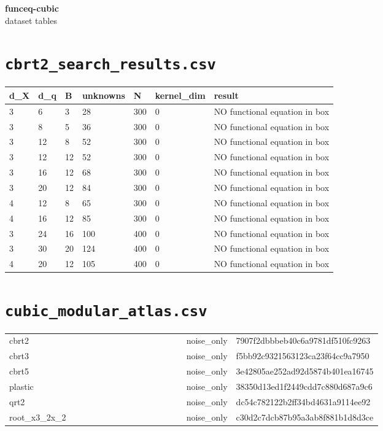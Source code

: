 \documentclass[10pt]{article}
\begin{document}
\begin{center}\Large\textbf{funceq-cubic} \\ \normalsize dataset tables\end{center}
\vspace{1em}
\section*{\texttt{cbrt2\_search\_results.csv}}
{\footnotesize
\begin{longtable}{@{}lllllll@{}}
\toprule
\textbf{d\_X} & \textbf{d\_q} & \textbf{B} & \textbf{unknowns} & \textbf{N} & \textbf{kernel\_dim} & \textbf{result} \\
\midrule\endhead
3 & 6 & 3 & 28 & 300 & 0 & NO functional equation in box \\
3 & 8 & 5 & 36 & 300 & 0 & NO functional equation in box \\
3 & 12 & 8 & 52 & 300 & 0 & NO functional equation in box \\
3 & 12 & 12 & 52 & 300 & 0 & NO functional equation in box \\
3 & 16 & 12 & 68 & 300 & 0 & NO functional equation in box \\
3 & 20 & 12 & 84 & 300 & 0 & NO functional equation in box \\
4 & 12 & 8 & 65 & 300 & 0 & NO functional equation in box \\
4 & 16 & 12 & 85 & 300 & 0 & NO functional equation in box \\
3 & 24 & 16 & 100 & 400 & 0 & NO functional equation in box \\
3 & 30 & 20 & 124 & 400 & 0 & NO functional equation in box \\
4 & 20 & 12 & 105 & 400 & 0 & NO functional equation in box \\
\bottomrule
\end{longtable}}


\section*{\texttt{cubic\_modular\_atlas.csv}}
{\footnotesize
\begin{longtable}{@{}llllllllllllllll@{}}
\toprule
\midrule\endhead
cbrt2 &  &  &  &  &  &  &  &  &  &  &  &  &  & noise\_only & 7907f2dbbbeb40c6a9781df510fc9263 \\
cbrt3 &  &  &  &  &  &  &  &  &  &  &  &  &  & noise\_only & f5bb92c9321563123ca23f64cc9a7950 \\
cbrt5 &  &  &  &  &  &  &  &  &  &  &  &  &  & noise\_only & 3e42805ae252ad92d5874b401ea16745 \\
plastic &  &  &  &  &  &  &  &  &  &  &  &  &  & noise\_only & 38350d13ed1f2449cdd7c880d687a9c6 \\
qrt2 &  &  &  &  &  &  &  &  &  &  &  &  &  & noise\_only & dc54c782122b2ff34bd4631a9114ee92 \\
root\_x3\_2x\_2 &  &  &  &  &  &  &  &  &  &  &  &  &  & noise\_only & c30d2c7dcb87b95a3ab8f881b1d8d3ce \\
\bottomrule
\end{longtable}}
\end{document}
